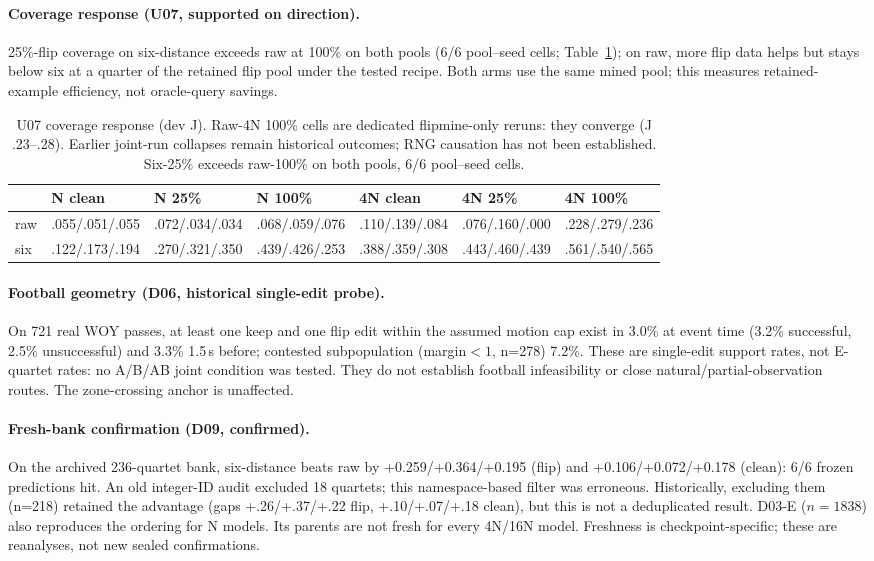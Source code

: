\paragraph{Coverage response (U07, supported on direction).} 25\%-flip coverage on six-distance exceeds raw at 100\% on both pools (6/6 pool--seed cells; Table~\ref{tab:u07}); on raw, more flip data helps but stays below six at a quarter of the retained flip pool under the tested recipe. Both arms use the same mined pool; this measures retained-example efficiency, not oracle-query savings.
\begin{table}[t]
\centering
\footnotesize
\setlength{\tabcolsep}{3pt}
\begin{tabular}{@{}lllllll@{}}
\toprule
 & N clean & N 25\% & N 100\% & 4N clean & 4N 25\% & 4N 100\% \\
\midrule
raw & .055/.051/.055 & .072/.034/.034 & .068/.059/.076 & .110/.139/.084 & .076/.160/.000 & .228/.279/.236 \\
six & .122/.173/.194 & .270/.321/.350 & .439/.426/.253 & .388/.359/.308 & .443/.460/.439 & .561/.540/.565 \\
\bottomrule
\end{tabular}
\caption{U07 coverage response (dev J). Raw-4N 100\% cells are dedicated flipmine-only reruns: they converge (J .23--.28). Earlier joint-run collapses remain historical outcomes; RNG causation has not been established. Six-25\% exceeds raw-100\% on both pools, 6/6 pool--seed cells.}
\label{tab:u07}
\end{table}
\paragraph{Football geometry (D06, historical single-edit probe).} On 721 real WOY passes, at least one keep and one flip edit within the assumed motion cap exist in 3.0\% at event time (3.2\% successful, 2.5\% unsuccessful) and 3.3\% 1.5\,s before; contested subpopulation (margin$<1$, n=278) 7.2\%. These are single-edit support rates, not E-quartet rates: no A/B/AB joint condition was tested. They do not establish football infeasibility or close natural/partial-observation routes. The zone-crossing anchor is unaffected.
\paragraph{Fresh-bank confirmation (D09, confirmed).} On the archived 236-quartet bank, six-distance beats raw by +0.259/+0.364/+0.195 (flip) and +0.106/+0.072/+0.178 (clean): 6/6 frozen predictions hit. An old integer-ID audit excluded 18 quartets; this namespace-based filter was erroneous. Historically, excluding them (n=218) retained the advantage (gaps +.26/+.37/+.22 flip, +.10/+.07/+.18 clean), but this is not a deduplicated result. D03-E ($n{=}1838$) also reproduces the ordering for N models. Its parents are not fresh for every 4N/16N model. Freshness is checkpoint-specific; these are reanalyses, not new sealed confirmations.
